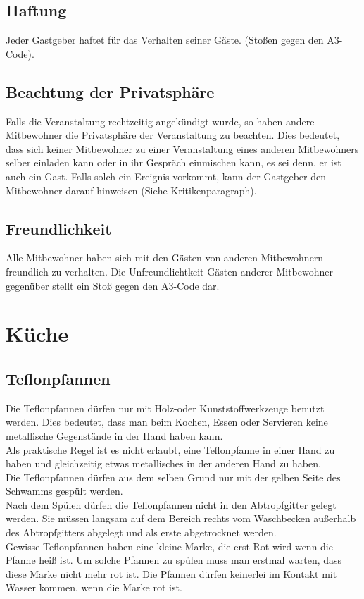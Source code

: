 \documentclass[10pt,a4paper,final]{article}
\begin{document}
\subsection{Haftung}  Jeder Gastgeber haftet für das Verhalten seiner Gäste. (Stoßen gegen den A3-Code).
\subsection{Beachtung der Privatsphäre} Falls die Veranstaltung rechtzeitig angekündigt wurde, so haben andere Mitbewohner die Privatsphäre der Veranstaltung zu beachten. Dies bedeutet, dass sich keiner Mitbewohner zu einer Veranstaltung eines anderen Mitbewohners selber einladen kann oder in ihr Gespräch einmischen kann, es sei denn, er ist auch ein Gast. Falls solch ein Ereignis vorkommt, kann der Gastgeber den Mitbewohner darauf hinweisen (Siehe Kritikenparagraph).
\subsection{Freundlichkeit} Alle Mitbewohner haben sich mit den Gästen von anderen Mitbewohnern freundlich zu verhalten. Die Unfreundlichtkeit Gästen anderer Mitbewohner gegenüber stellt ein Stoß gegen den A3-Code dar.

\section{Küche}
\subsection{Teflonpfannen}
Die Teflonpfannen dürfen nur mit Holz-oder Kunststoffwerkzeuge benutzt werden. Dies bedeutet, dass man beim Kochen, Essen oder Servieren keine metallische Gegenstände in der Hand haben kann.\\
Als praktische Regel ist es nicht erlaubt, eine Teflonpfanne in einer Hand zu haben und gleichzeitig etwas metallisches in der anderen Hand zu haben.\\
Die Teflonpfannen dürfen aus dem selben Grund nur mit der gelben Seite des Schwamms gespült werden.\\
Nach dem Spülen dürfen die Teflonpfannen nicht in den Abtropfgitter gelegt werden. Sie müssen langsam auf dem Bereich rechts vom Waschbecken außerhalb des Abtropfgitters abgelegt und als erste abgetrocknet werden.\\
Gewisse Teflonpfannen haben eine kleine Marke, die erst Rot wird wenn die Pfanne heiß ist. Um solche Pfannen zu spülen muss man erstmal warten, dass diese Marke nicht mehr rot ist. Die Pfannen dürfen keinerlei im Kontakt mit Wasser kommen, wenn die Marke rot ist. 
\end{document}
